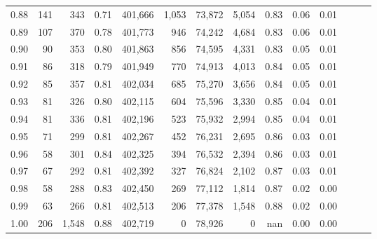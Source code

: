 \begin{tabular}{rrrrrrrrrrrrrr}
0.88 &     141 &    343 &  0.71 &  401,666 &    1,053 &  73,872 &   5,054 &  0.83 &  0.06 &      0.01 \\
0.89 &     107 &    370 &  0.78 &  401,773 &      946 &  74,242 &   4,684 &  0.83 &  0.06 &      0.01 \\
0.90 &      90 &    353 &  0.80 &  401,863 &      856 &  74,595 &   4,331 &  0.83 &  0.05 &      0.01 \\
0.91 &      86 &    318 &  0.79 &  401,949 &      770 &  74,913 &   4,013 &  0.84 &  0.05 &      0.01 \\
0.92 &      85 &    357 &  0.81 &  402,034 &      685 &  75,270 &   3,656 &  0.84 &  0.05 &      0.01 \\
0.93 &      81 &    326 &  0.80 &  402,115 &      604 &  75,596 &   3,330 &  0.85 &  0.04 &      0.01 \\
0.94 &      81 &    336 &  0.81 &  402,196 &      523 &  75,932 &   2,994 &  0.85 &  0.04 &      0.01 \\
0.95 &      71 &    299 &  0.81 &  402,267 &      452 &  76,231 &   2,695 &  0.86 &  0.03 &      0.01 \\
0.96 &      58 &    301 &  0.84 &  402,325 &      394 &  76,532 &   2,394 &  0.86 &  0.03 &      0.01 \\
0.97 &      67 &    292 &  0.81 &  402,392 &      327 &  76,824 &   2,102 &  0.87 &  0.03 &      0.01 \\
0.98 &      58 &    288 &  0.83 &  402,450 &      269 &  77,112 &   1,814 &  0.87 &  0.02 &      0.00 \\
0.99 &      63 &    266 &  0.81 &  402,513 &      206 &  77,378 &   1,548 &  0.88 &  0.02 &      0.00 \\
1.00 &     206 &  1,548 &  0.88 &  402,719 &        0 &  78,926 &       0 &   nan &  0.00 &      0.00 \\
\bottomrule
\end{tabular}
